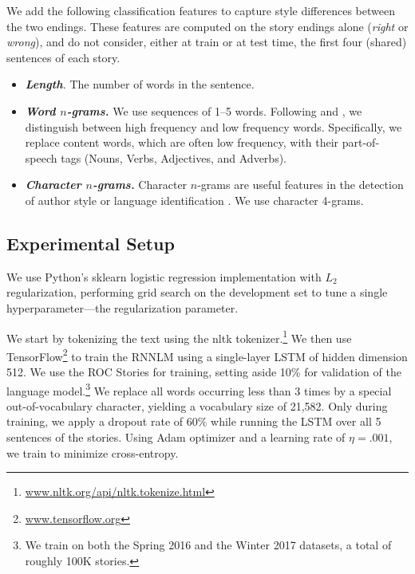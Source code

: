 \documentclass[11pt]{article}
\begin{document}
We add the following classification features to capture style differences between the two endings. 
These features are computed on the story endings alone ({\it right} or {\it wrong}), and do not consider, either at train or at test time, the first four (shared) sentences of each story.
\begin{itemize}
\item\textit{\textbf{Length}.} The number of words in the sentence.
\item\textit{\textbf{Word $n$-grams.}} We use sequences of 1--5
  words. Following  and , we distinguish between high frequency and low frequency words. 
Specifically, we replace content words, which are often low frequency, with their part-of-speech tags (Nouns, Verbs, Adjectives, and Adverbs).
\item\textit{\textbf{Character $n$-grams.}} Character $n$-grams are useful features in the detection of author style \cite{Stamatatos:2009} or language identification \cite{lui2011cross}.
We use character 4-grams.
\end{itemize}



\subsection{Experimental Setup}
We use  Python's sklearn logistic regression implementation with $L_2$
regularization, performing grid search on the development set to
tune a single hyperparameter---the regularization parameter.  

We start by tokenizing the text using the nltk tokenizer.\footnote{\url{www.nltk.org/api/nltk.tokenize.html}} 
We then use TensorFlow\footnote{\url{www.tensorflow.org}} to train the RNNLM using a single-layer LSTM of hidden dimension 512.
We use the ROC Stories for training, setting aside 10\% for validation of the language model.\footnote{We train on both the Spring 2016 and the Winter 2017 datasets, a total of roughly 100K stories.}
We replace all words occurring less than 3 times by a special out-of-vocabulary character, yielding a vocabulary size of 21,582.
Only during training, we apply a dropout rate of 60\% while running the LSTM over all 5 sentences of the stories. 
Using Adam optimizer \cite{kingma2014adam} and a learning rate of
$\eta=.001$, we train to minimize cross-entropy.
\end{document}
